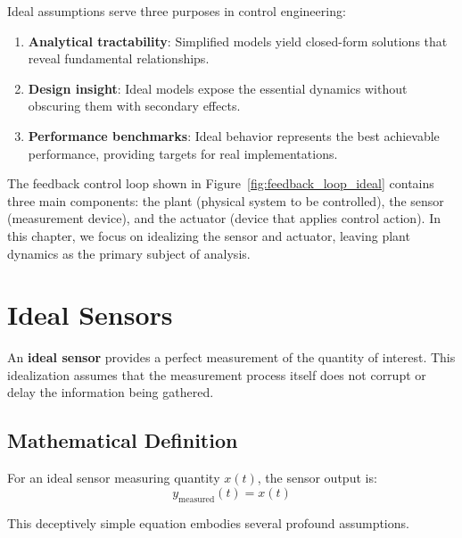\begin{keyconceptbox}[title=The Idealization Philosophy]
Ideal assumptions serve three purposes in control engineering:
\begin{enumerate}
    \item \textbf{Analytical tractability}: Simplified models yield closed-form solutions that reveal fundamental relationships.
    \item \textbf{Design insight}: Ideal models expose the essential dynamics without obscuring them with secondary effects.
    \item \textbf{Performance benchmarks}: Ideal behavior represents the best achievable performance, providing targets for real implementations.
\end{enumerate}
\end{keyconceptbox}

The feedback control loop shown in Figure~\ref{fig:feedback_loop_ideal} contains three main components: the plant (physical system to be controlled), the sensor (measurement device), and the actuator (device that applies control action). In this chapter, we focus on idealizing the sensor and actuator, leaving plant dynamics as the primary subject of analysis.



\section{Ideal Sensors}
\label{sec:ideal_sensors}

An \textbf{ideal sensor} provides a perfect measurement of the quantity of interest. This idealization assumes that the measurement process itself does not corrupt or delay the information being gathered.

\subsection{Mathematical Definition}

For an ideal sensor measuring quantity $x(t)$, the sensor output is:
\begin{equation}
\boxed{y_{\text{measured}}(t) = x(t)}
\label{eq:ideal_sensor}
\end{equation}

This deceptively simple equation embodies several profound assumptions.


